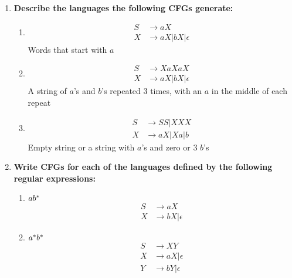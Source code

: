

\begin{enumerate}

\item \textbf{Describe the languages the following CFGs generate:}

\begin{enumerate}
  \item
    \begin{equation*}
      \begin{aligned}
        S &\rightarrow aX \\
        X &\rightarrow aX | bX | \epsilon
      \end{aligned}
    \end{equation*}
    Words that start with $a$
  \item
    \begin{equation*}
      \begin{aligned}
        S &\rightarrow XaXaX \\
        X &\rightarrow aX | bX | \epsilon
      \end{aligned}
    \end{equation*}
    A string of $a$'s and $b$'s repeated 3 times, with 
    an $a$ in the middle of each repeat
  \item
    \begin{equation*}
      \begin{aligned}
        S &\rightarrow SS | XXX \\
        X &\rightarrow aX | Xa | b
      \end{aligned}
    \end{equation*}
    Empty string or a string with $a$'s and zero or 3 $b$'s
\end{enumerate}

\newpage
\item \textbf{Write CFGs for each of the languages defined by the following regular expressions:}
\begin{enumerate}
  \item $ab{}^\ast$
    \begin{equation*}
      \begin{aligned}
        S &\rightarrow aX \\
        X &\rightarrow bX | \epsilon
      \end{aligned}
    \end{equation*}

  \item $a{}^\ast b{}^\ast$
    \begin{equation*}
      \begin{aligned}
        S &\rightarrow XY \\
        X &\rightarrow aX | \epsilon \\
        Y &\rightarrow bY | \epsilon
      \end{aligned}
    \end{equation*}
    

\end{enumerate}
\end{enumerate}
